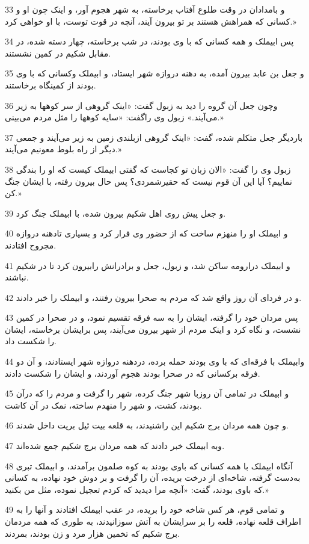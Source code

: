 \par 33 و بامدادان در وقت طلوع آفتاب برخاسته، به شهر هجوم آور، و اینک چون او و کسانی که همراهش هستند بر تو بیرون آیند، آنچه در قوت توست، با او خواهی کرد.»
\par 34 پس ابیملک و همه کسانی که با وی بودند، در شب برخاسته، چهار دسته شده، در مقابل شکیم در کمین نشستند.
\par 35 و جعل بن عابد بیرون آمده، به دهنه دروازه شهر ایستاد، و ابیملک وکسانی که با وی بودند از کمینگاه برخاستند.
\par 36 وچون جعل آن گروه را دید به زبول گفت: «اینک گروهی از سر کوهها به زیر می‌آیند.» زبول وی راگفت: «سایه کوهها را مثل مردم می‌بینی.»
\par 37 باردیگر جعل متکلم شده، گفت: «اینک گروهی ازبلندی زمین به زیر می‌آیند و جمعی دیگر از راه بلوط معونیم می‌آیند.»
\par 38 زبول وی را گفت: «الان زبان تو کجاست که گفتی ابیملک کیست که او را بندگی نماییم؟ آیا این آن قوم نیست که حقیرشمردی؟ پس حال بیرون رفته، با ایشان جنگ کن.»
\par 39 و جعل پیش روی اهل شکیم بیرون شده، با ابیملک جنگ کرد.
\par 40 و ابیملک او را منهزم ساخت که از حضور وی فرار کرد و بسیاری تادهنه دروازه مجروح افتادند.
\par 41 و ابیملک درارومه ساکن شد، و زبول، جعل و برادرانش رابیرون کرد تا در شکیم نباشند.
\par 42 و در فردای آن روز واقع شد که مردم به صحرا بیرون رفتند، و ابیملک را خبر دادند.
\par 43 پس مردان خود را گرفته، ایشان را به سه فرقه تقسیم نمود، و در صحرا در کمین نشست، و نگاه کرد و اینک مردم از شهر بیرون می‌آیند، پس برایشان برخاسته، ایشان را شکست داد.
\par 44 وابیملک با فرقه‌ای که با وی بودند حمله برده، دردهنه دروازه شهر ایستادند، و آن دو فرقه برکسانی که در صحرا بودند هجوم آوردند، و ایشان را شکست دادند.
\par 45 و ابیملک در تمامی آن روزبا شهر جنگ کرده، شهر را گرفت و مردم را که درآن بودند، کشت، و شهر را منهدم ساخته، نمک در آن کاشت.
\par 46 و چون همه مردان برج شکیم این راشنیدند، به قلعه بیت ئیل بریت داخل شدند.
\par 47 وبه ابیملک خبر دادند که همه مردان برج شکیم جمع شده‌اند.
\par 48 آنگاه ابیملک با همه کسانی که باوی بودند به کوه صلمون برآمدند، و ابیملک تبری به‌دست گرفته، شاخه‌ای از درخت بریده، آن را گرفت و بر دوش خود نهاده، به کسانی که باوی بودند، گفت: «آنچه مرا دیدید که کردم تعجیل نموده، مثل من بکنید.»
\par 49 و تمامی قوم، هر کس شاخه خود را بریده، در عقب ابیملک افتادند و آنها را به اطراف قلعه نهاده، قلعه را بر سرایشان به آتش سوزانیدند، به طوری که همه مردمان برج شکیم که تخمین هزار مرد و زن بودند، بمردند.
